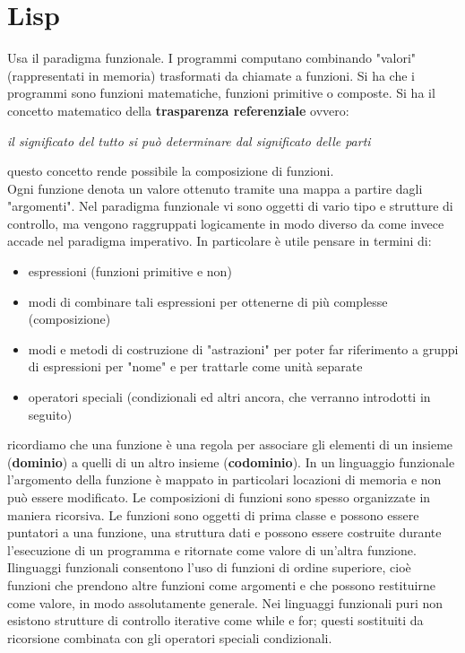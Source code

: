 \documentclass[a4paper,12pt, oneside]{book}
\begin{document}
\chapter{Lisp}
Usa il paradigma funzionale. I programmi computano combinando "valori" (rappresentati in memoria) trasformati da chiamate a funzioni. Si ha che i programmi sono funzioni matematiche, funzioni primitive o composte. Si ha il concetto matematico della \textbf{trasparenza referenziale} ovvero:
\begin{center}
\textit{il significato del tutto si può determinare dal significato delle parti}
\end{center}
questo concetto rende possibile la composizione di funzioni.\\
Ogni funzione denota un valore ottenuto tramite una mappa a
partire dagli "argomenti". Nel paradigma funzionale vi sono oggetti di vario tipo e strutture di controllo, ma vengono raggruppati logicamente in modo
diverso da come invece accade nel paradigma imperativo. In
particolare è utile pensare in termini di:
\begin{itemize}
\item espressioni (funzioni primitive e non)
\item modi di combinare tali espressioni per ottenerne di più
complesse (composizione)
\item modi e metodi di costruzione di "astrazioni" per poter far
riferimento a gruppi di espressioni per "nome" e per trattarle
come unità separate
\item operatori speciali (condizionali ed altri ancora, che verranno
introdotti in seguito)
\end{itemize}
ricordiamo che una funzione è una regola per associare gli elementi di un insieme (\textbf{dominio}) a quelli di un altro insieme (\textbf{codominio}). In un linguaggio funzionale l'argomento della funzione è mappato in particolari locazioni di memoria e non può essere modificato. Le composizioni di funzioni sono spesso organizzate in maniera ricorsiva. Le funzioni sono oggetti di prima classe e possono essere puntatori a una funzione, una struttura dati e possono essere costruite durante l'esecuzione di un programma e ritornate come valore di un'altra funzione. Ilinguaggi funzionali consentono l'uso di funzioni di ordine superiore, cioè funzioni che prendono altre funzioni come argomenti e che possono restituirne come valore, in modo assolutamente generale. Nei linguaggi funzionali puri non esistono strutture di controllo iterative come while e for; questi sostituiti da ricorsione combinata con gli operatori speciali condizionali.\\
\end{document}
